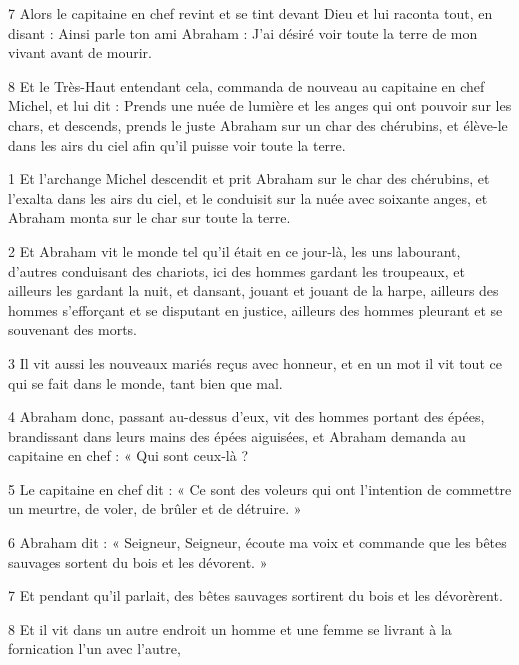 \par 7 Alors le capitaine en chef revint et se tint devant Dieu et lui raconta tout, en disant : Ainsi parle ton ami Abraham : J'ai désiré voir toute la terre de mon vivant avant de mourir.

\par 8 Et le Très-Haut entendant cela, commanda de nouveau au capitaine en chef Michel, et lui dit : Prends une nuée de lumière et les anges qui ont pouvoir sur les chars, et descends, prends le juste Abraham sur un char des chérubins, et élève-le dans les airs du ciel afin qu'il puisse voir toute la terre.


\par 1 Et l'archange Michel descendit et prit Abraham sur le char des chérubins, et l'exalta dans les airs du ciel, et le conduisit sur la nuée avec soixante anges, et Abraham monta sur le char sur toute la terre.

\par 2 Et Abraham vit le monde tel qu'il était en ce jour-là, les uns labourant, d'autres conduisant des chariots, ici des hommes gardant les troupeaux, et ailleurs les gardant la nuit, et dansant, jouant et jouant de la harpe, ailleurs des hommes s'efforçant et se disputant en justice, ailleurs des hommes pleurant et se souvenant des morts.

\par 3 Il vit aussi les nouveaux mariés reçus avec honneur, et en un mot il vit tout ce qui se fait dans le monde, tant bien que mal.

\par 4 Abraham donc, passant au-dessus d'eux, vit des hommes portant des épées, brandissant dans leurs mains des épées aiguisées, et Abraham demanda au capitaine en chef : « Qui sont ceux-là ?

\par 5 Le capitaine en chef dit : « Ce sont des voleurs qui ont l'intention de commettre un meurtre, de voler, de brûler et de détruire. »

\par 6 Abraham dit : « Seigneur, Seigneur, écoute ma voix et commande que les bêtes sauvages sortent du bois et les dévorent. »

\par 7 Et pendant qu'il parlait, des bêtes sauvages sortirent du bois et les dévorèrent.

\par 8 Et il vit dans un autre endroit un homme et une femme se livrant à la fornication l'un avec l'autre,

